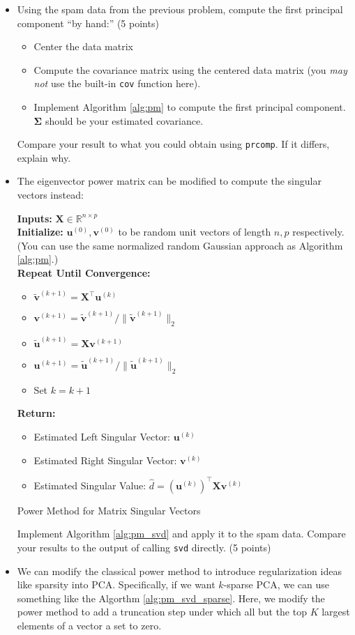 \documentclass[10pt]{article}
\newcommand{\R}{\mathbb{R}}
\newcommand{\bX}{\bm{X}}
\newcommand{\bSigma}{\bm{\Sigma}}
\newcommand{\bv}{\bm{v}}
\newcommand{\bu}{\bm{u}}
\begin{document}
\begin{itemize}
    \item Using the spam data from the previous problem, compute the first principal component ``by hand:''  (5 points)
    \begin{itemize}
        \item Center the data matrix
        \item Compute the covariance matrix using the centered data matrix (you \emph{may not} use the built-in \texttt{cov} function here). 
        \item Implement Algorithm \ref{alg:pm} to compute the first principal component. $\bSigma$ should be your estimated covariance.
    \end{itemize}
    Compare your result to what you could obtain using \texttt{prcomp}. If it differs, explain why.
    \item The eigenvector power matrix can be modified to compute the singular vectors instead:
   \begin{algorithm}
\textbf{Inputs:} $\bX \in \R^{n \times p}$\\
\textbf{Initialize:} $\bu^{(0)}, \bv^{(0)}$ to be  random unit vectors of length $n, p$ respectively.\\\phantom{initialize: a} (You can use the same normalized random Gaussian approach as Algorithm \ref{alg:pm}.)\\
\textbf{Repeat Until Convergence:}
\begin{itemize}
    \item $\tilde{\bv}^{(k+1)} = \bX^{\top} \bu^{(k)}$
    \item $\bv^{(k+1)} = \tilde{\bv}^{(k+1)} / \|\tilde{\bv}^{(k+1)}\|_2$
    \item $\tilde{\bu}^{(k+1)} = \bX \bv^{(k+1)}$
    \item $\bu^{(k+1)} = \tilde{\bu}^{(k+1)} / \|\tilde{\bu}^{(k+1)}\|_2$
    \item Set $k = k + 1$
\end{itemize}
\textbf{Return:}
\begin{itemize}
    \item Estimated Left Singular Vector: $\bu^{(k)}$
    \item Estimated Right Singular Vector: $\bv^{(k)}$
    \item Estimated Singular Value: $\hat{d} = (\bu^{(k)})^{\top}\bX\bv^{(k)}$
\end{itemize}
    \caption{Power Method for Matrix Singular Vectors}
    \label{alg:pm_svd}
\end{algorithm} 
Implement Algorithm \ref{alg:pm_svd} and apply it to the spam data. Compare your results to the output of calling \texttt{svd} directly. (5 points)
\item We can modify the classical power method to introduce regularization ideas like sparsity into PCA. Specifically, if we want $k$-sparse PCA, we can use something like the Algorthm \ref{alg:pm_svd_sparse}. Here, we modify the power method to add a truncation step under which all but the top $K$ largest elements of a vector a set to zero. 


\end{itemize}
\end{document}
